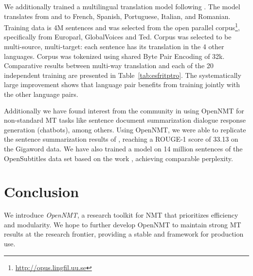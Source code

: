 \documentclass[11pt,a4paper]{article}
\begin{document}
We additionally trained a multilingual translation model following
. The model translates from and to French,
Spanish, Portuguese, Italian, and Romanian. Training data is 4M
sentences and was selected from the open parallel
corpus\footnote{\url{http://opus.lingfil.uu.se}}, specifically from
Europarl, GlobalVoices and Ted. Corpus was selected to be
multi-source, multi-target: each sentence has its translation in the 4
other languages. Corpus was tokenized using shared Byte
Pair Encoding of 32k.  Comparative results between multi-way
translation and each of the 20 independent training are presented in
Table~\ref{tab:esfritptro}. The systematically large improvement shows
that language pair benefits from training jointly with the other language pairs.

Additionally we have found interest from the community in using
OpenNMT for non-standard MT tasks like sentence document summarization
dialogue response generation (chatbots), among others.  Using
OpenNMT, we were able to replicate the sentence summarization results
of \citet{chopra2016abstractive}, reaching a ROUGE-1 score of 33.13 on
the Gigaword data. We have also trained a model on 14 million
sentences of the OpenSubtitles data set based on the work
\citet{vinyals2015neural}, achieving comparable perplexity.













\section{Conclusion}

We introduce \textit{OpenNMT}, a research toolkit for NMT that
prioritizes efficiency and modularity. We hope to further develop
OpenNMT to maintain strong MT results at the research frontier, 
providing a stable and framework for production use.

\newpage 







  
\end{document}

